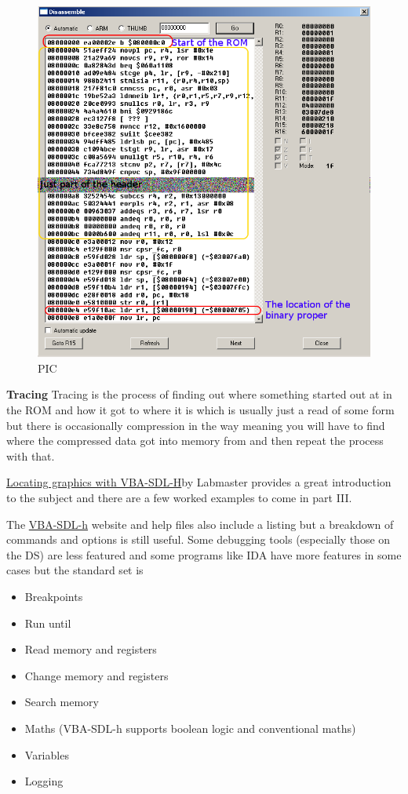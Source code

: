 \documentclass[
]{book}
\providecommand{\tightlist}{%
  \setlength{\itemsep}{0pt}\setlength{\parskip}{0pt}}
\begin{document}
\begin{figure}
\centering
\includegraphics{images/214_home_fast6191_romhackingguide_unrenamed_fil___borders_romhackingguidegbabinarylocationVBA.png}
\caption{PIC}
\end{figure}

\textbf{Tracing} Tracing is the process of finding out where something started out at in the ROM and how it got to where it is which is usually just a read of some form but there is occasionally compression in the way meaning you will have to find where the compressed data got into memory from and then repeat the process with that.

\href{http://www.romhacking.net/documents/361/}{Locating graphics with VBA-SDL-H}by Labmaster provides a great introduction to the subject and there are a few worked examples to come in part III.

The \href{http://labmaster.bios.net.nz/vba-sdl-h/\#commands}{VBA-SDL-h} website and help files also include a listing but a breakdown of commands and options is still useful. Some debugging tools (especially those on the DS) are less featured and some programs like IDA have more features in some cases but the standard set is

\begin{itemize}
\tightlist
\item
  Breakpoints
\item
  Run until
\item
  Read memory and registers
\item
  Change memory and registers
\item
  Search memory
\item
  Maths (VBA-SDL-h supports boolean logic and conventional maths)
\item
  Variables
\item
  Logging
\end{itemize}
\end{document}
